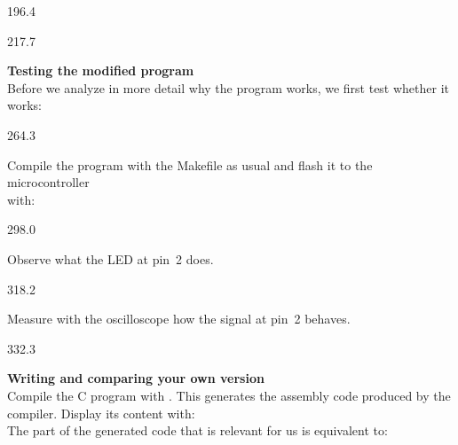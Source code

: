 \documentclass{aslab}
\begin{document}
\begin{region}{196.4}
\end{region}

\begin{region}[pitch=13.27]{217.7}
\begin{numlist}
\item \textbf{Testing the modified program}\\
  Before we analyze in more detail why the program works, we first test
  whether it works:
\end{numlist}
\end{region}

\begin{region}[x=74.7,right=0,pitch=13.5]{264.3}
\begin{bullets}
\item Compile the program with the Makefile as usual and flash it to the
  microcontroller\\ with: 
\end{bullets}
\end{region}

\begin{region}[x=74.7,right=0]{298.0}
\begin{bullets}
\item Observe what the LED at pin~2 does.
\end{bullets}
\end{region}

\begin{region}[x=74.7,right=0]{318.2}
\begin{bullets}
\item Measure with the oscilloscope how the signal at pin~2 behaves.
\end{bullets}
\end{region}

\begin{region}[pitch=13.43]{332.3}
\begin{numlist}[start=2]
\item \textbf{Writing and comparing your own version}\\
  Compile the C program with . This generates
  the assembly code produced by the compiler. Display its content with:
  \\
  The part of the generated code that is relevant for us is equivalent to:
\end{numlist}
\end{region}
\end{document}
